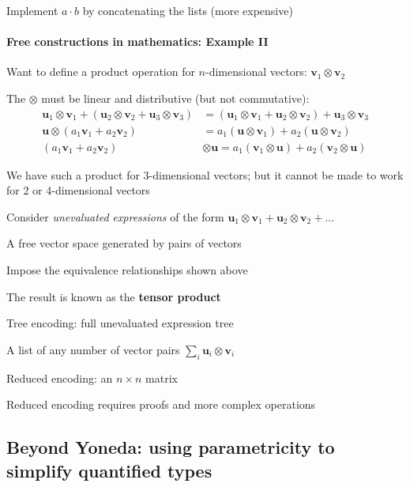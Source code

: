 Implement $a\cdot b$ by concatenating the lists (more expensive)


\paragraph{Free constructions in mathematics: Example II}

Want to define a product operation for $n$-dimensional vectors: $\mathbf{v}_{1}\otimes\mathbf{v}_{2}$

The $\otimes$ must be linear and distributive (but not commutative):
\begin{align*}
\mathbf{u}_{1}\otimes\mathbf{v}_{1}+\left(\mathbf{u}_{2}\otimes\mathbf{v}_{2}+\mathbf{u}_{3}\otimes\mathbf{v}_{3}\right) & =\left(\mathbf{u}_{1}\otimes\mathbf{v}_{1}+\mathbf{u}_{2}\otimes\mathbf{v}_{2}\right)+\mathbf{u}_{3}\otimes\mathbf{v}_{3}\\
\mathbf{u}\otimes\left(a_{1}\mathbf{v}_{1}+a_{2}\mathbf{v}_{2}\right) & =a_{1}\left(\mathbf{u}\otimes\mathbf{v}_{1}\right)+a_{2}\left(\mathbf{u}\otimes\mathbf{v}_{2}\right)\\
\left(a_{1}\mathbf{v}_{1}+a_{2}\mathbf{v}_{2}\right) & \otimes\mathbf{u}=a_{1}\left(\mathbf{v}_{1}\otimes\mathbf{u}\right)+a_{2}\left(\mathbf{v}_{2}\otimes\mathbf{u}\right)
\end{align*}

We have such a product for 3-dimensional vectors; but it cannot be
made to work for 2 or 4-dimensional vectors

Consider \emph{unevaluated} \emph{expressions} of the form $\mathbf{u}_{1}\otimes\mathbf{v}_{1}+\mathbf{u}_{2}\otimes\mathbf{v}_{2}+...$

A free vector space generated by pairs of vectors

Impose the equivalence relationships shown above

The result is known as the \textbf{tensor product}

Tree encoding: full unevaluated expression tree

A list of any number of vector pairs $\sum_{i}\mathbf{u}_{i}\otimes\mathbf{v}_{i}$

Reduced encoding: an $n\times n$ matrix

Reduced encoding requires proofs and more complex operations

\subsection{Beyond Yoneda: using parametricity to simplify quantified types}

